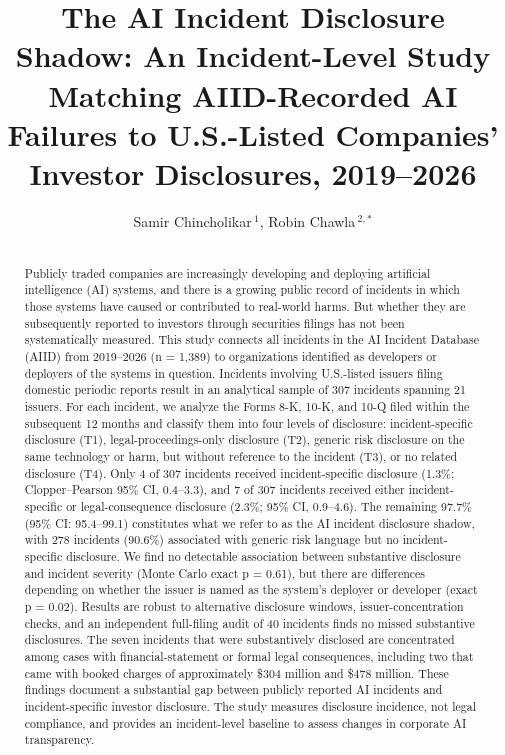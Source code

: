 \documentclass[utf8]{FrontiersinHarvard}
\def\firstAuthorLast{Chincholikar {and} Chawla}
\def\Authors{Samir Chincholikar\,$^{1}$, Robin Chawla\,$^{2,*}$}
\begin{document}
\onecolumn
{}

\title[The AI Incident Disclosure Shadow]{The AI Incident Disclosure Shadow: An Incident-Level Study Matching AIID-Recorded AI Failures to U.S.-Listed Companies' Investor Disclosures, 2019--2026}

\author[\firstAuthorLast ]{\Authors}
\address{}
\correspondance{}
\extraAuth{}

\maketitle

\begin{abstract}
\section{}
Publicly traded companies are increasingly developing and deploying artificial intelligence (AI) systems, and there is a growing public record of incidents in which those systems have caused or contributed to real-world harms. But whether they are subsequently reported to investors through securities filings has not been systematically measured. This study connects all incidents in the AI Incident Database (AIID) from 2019--2026 (n = 1{,}389) to organizations identified as developers or deployers of the systems in question. Incidents involving U.S.-listed issuers filing domestic periodic reports result in an analytical sample of 307 incidents spanning 21 issuers. For each incident, we analyze the Forms 8-K, 10-K, and 10-Q filed within the subsequent 12 months and classify them into four levels of disclosure: incident-specific disclosure (T1), legal-proceedings-only disclosure (T2), generic risk disclosure on the same technology or harm, but without reference to the incident (T3), or no related disclosure (T4). Only 4 of 307 incidents received incident-specific disclosure (1.3\%; Clopper--Pearson 95\% CI, 0.4--3.3), and 7 of 307 incidents received either incident-specific or legal-consequence disclosure (2.3\%; 95\% CI, 0.9--4.6). The remaining 97.7\% (95\% CI: 95.4--99.1) constitutes what we refer to as the AI incident disclosure shadow, with 278 incidents (90.6\%) associated with generic risk language but no incident-specific disclosure. We find no detectable association between substantive disclosure and incident severity (Monte Carlo exact p = 0.61), but there are differences depending on whether the issuer is named as the system's deployer or developer (exact p = 0.02). Results are robust to alternative disclosure windows, issuer-concentration checks, and an independent full-filing audit of 40 incidents finds no missed substantive disclosures. The seven incidents that were substantively disclosed are concentrated among cases with financial-statement or formal legal consequences, including two that came with booked charges of approximately \$304 million and \$478 million. These findings document a substantial gap between publicly reported AI incidents and incident-specific investor disclosure. The study measures disclosure incidence, not legal compliance, and provides an incident-level baseline to assess changes in corporate AI transparency.


\end{abstract}
\end{document}
